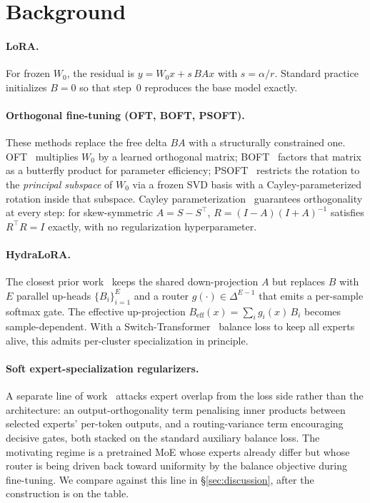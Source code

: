 \documentclass[10pt]{article}
\newcommand{\T}{^{\!\top}}
\begin{document}
\section{Background}
\label{sec:background}

\paragraph{LoRA.} For frozen $W_0$, the residual is $y = W_0 x + s\,
B A x$ with $s = \alpha/r$. Standard practice~\cite{hu2022lora}
initializes $B = 0$ so that step~$0$ reproduces the base model exactly.

\paragraph{Orthogonal fine-tuning (OFT, BOFT, PSOFT).} These methods
replace the free delta $BA$ with a structurally constrained one.
OFT~\cite{qiu2023oft} multiplies $W_0$ by a learned orthogonal matrix;
BOFT~\cite{liu2024boft} factors that matrix as a butterfly product
for parameter efficiency; PSOFT~\cite{wu2026psoft} restricts the
rotation to the \emph{principal subspace} of $W_0$ via a frozen SVD
basis with a Cayley-parameterized rotation inside that subspace.
Cayley parameterization~\cite{lezcano2019cayley} guarantees
orthogonality at every step: for skew-symmetric $A = S - S\T$,
$R = (I-A)(I+A)^{-1}$ satisfies $R\T R = I$ exactly, with no
regularization hyperparameter.

\paragraph{HydraLoRA.} The closest prior work~\cite{tian2024hydralora}
keeps the shared down-projection $A$ but replaces $B$ with $E$
parallel up-heads $\{B_i\}_{i=1}^E$ and a router $g(\cdot) \in
\Delta^{E-1}$ that emits a per-sample softmax gate. The effective
up-projection $B_{\mathrm{eff}}(x) = \sum_i g_i(x)\, B_i$ becomes
sample-dependent. With a Switch-Transformer~\cite{fedus2022switch}
balance loss to keep all experts alive, this admits per-cluster
specialization in principle.

\paragraph{Soft expert-specialization regularizers.} A separate
line of work~\cite{guo2025advancing} attacks expert overlap from the
loss side rather than the architecture: an output-orthogonality term
penalising inner products between selected experts' per-token outputs,
and a routing-variance term encouraging decisive gates, both stacked
on the standard auxiliary balance loss. The motivating regime is a
pretrained MoE whose experts already differ but whose router is being
driven back toward uniformity by the balance objective during
fine-tuning. We compare against this line in
\S\ref{sec:discussion}, after the construction is on the table.
\end{document}
